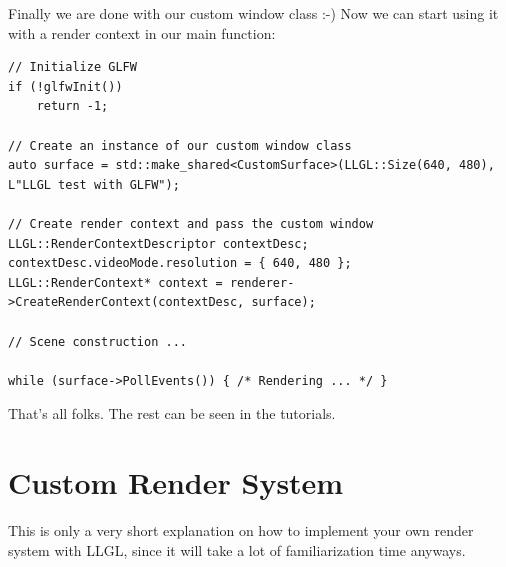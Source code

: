 \documentclass{article}
\begin{document}
Finally we are done with our custom window class :-) Now we can start using it with a render context in our main function:
\begin{lstlisting}
// Initialize GLFW
if (!glfwInit())
	return -1;

// Create an instance of our custom window class
auto surface = std::make_shared<CustomSurface>(LLGL::Size(640, 480), L"LLGL test with GLFW");

// Create render context and pass the custom window
LLGL::RenderContextDescriptor contextDesc;
contextDesc.videoMode.resolution = { 640, 480 };
LLGL::RenderContext* context = renderer->CreateRenderContext(contextDesc, surface);

// Scene construction ...

while (surface->PollEvents()) { /* Rendering ... */ }
\end{lstlisting}
That's all folks. The rest can be seen in the tutorials.



\newpage
\section{Custom Render System}
\label{sec:custom_renderer}

This is only a very short explanation on how to implement your own render system with LLGL,
since it will take a lot of familiarization time anyways.
\end{document}
